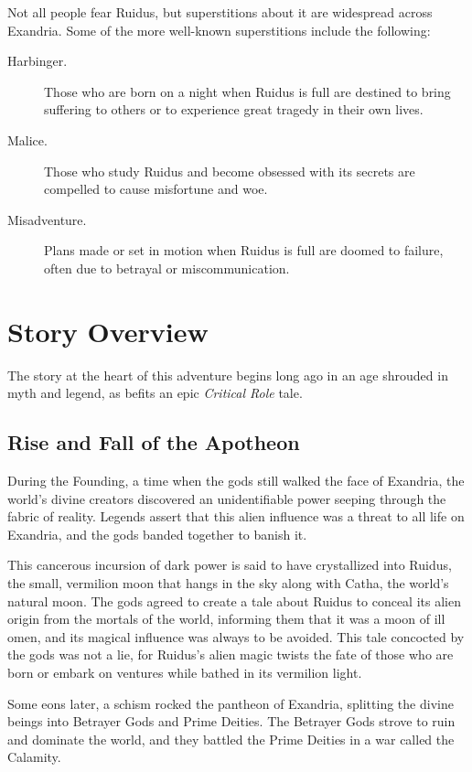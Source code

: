 \documentclass[10pt,a4paper,twoside,bg=print,twocolumn,openany,nodeprecatedcode]{dndbook}
\begin{document}
Not all people fear Ruidus, but superstitions about it are widespread across Exandria. Some of the more well-known superstitions include the following:


\begin{description}
\item[Harbinger.]
Those who are born on a night when Ruidus is full are destined to bring suffering to others or to experience great tragedy in their own lives.
\item[Malice.]
Those who study Ruidus and become obsessed with its secrets are compelled to cause misfortune and woe.
\item[Misadventure.]
Plans made or set in motion when Ruidus is full are doomed to failure, often due to betrayal or miscommunication.
\end{description}

\section{Story Overview}
The story at the heart of this adventure begins long ago in an age shrouded in myth and legend, as befits an epic \textit{Critical Role} tale.

\subsection{Rise and Fall of the Apotheon}
During the Founding, a time when the gods still walked the face of Exandria, the world's divine creators discovered an unidentifiable power seeping through the fabric of reality. Legends assert that this alien influence was a threat to all life on Exandria, and the gods banded together to banish it.

This cancerous incursion of dark power is said to have crystallized into Ruidus, the small, vermilion moon that hangs in the sky along with Catha, the world's natural moon. The gods agreed to create a tale about Ruidus to conceal its alien origin from the mortals of the world, informing them that it was a moon of ill omen, and its magical influence was always to be avoided. This tale concocted by the gods was not a lie, for Ruidus's alien magic twists the fate of those who are born or embark on ventures while bathed in its vermilion light.

Some eons later, a schism rocked the pantheon of Exandria, splitting the divine beings into Betrayer Gods and Prime Deities. The Betrayer Gods strove to ruin and dominate the world, and they battled the Prime Deities in a war called the Calamity.
\end{document}
